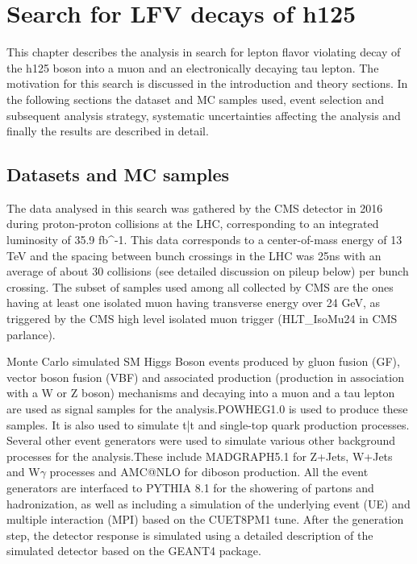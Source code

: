 
%
%

\chapter{Search for LFV decays of h125}
\label{chap:analysis_smhiggs}
This chapter describes the analysis in search for lepton flavor violating decay of the h125 boson into a muon and an electronically decaying tau lepton. The motivation for this search is discussed in the introduction and theory sections. In the following sections the dataset and MC samples used, event selection and subsequent analysis strategy, systematic uncertainties affecting the analysis and finally the results are described in detail.

\section{Datasets and MC samples}

The data analysed in this search was gathered by the CMS detector in 2016 during proton-proton collisions at the LHC, corresponding to an integrated luminosity of 35.9 fb^{-1}. This data corresponds to a center-of-mass energy of 13 TeV and the spacing between bunch crossings in the LHC was 25ns with an average of about 30 collisions (see detailed discussion on pileup below) per bunch crossing. The subset of samples used among all collected by CMS are the ones having at least one isolated muon having transverse energy over 24 GeV, as triggered by the CMS high level isolated muon trigger (HLT_IsoMu24 in CMS parlance).

Monte Carlo simulated SM Higgs Boson events produced by  gluon fusion (GF), vector boson fusion (VBF) and associated production (production in association with a W or Z boson) mechanisms and decaying into a muon and a tau lepton are used as signal samples for the analysis.POWHEG1.0 is used to produce these samples. It is also used to simulate t\bar{t} and single-top quark production processes. Several other event generators were used to simulate various other background processes for the analysis.These include MADGRAPH5.1 for Z+Jets, W+Jets and W$\gamma$ processes and AMC@NLO for diboson production. All the event generators are interfaced to PYTHIA 8.1 for the showering of partons and hadronization, as well as including a simulation of the underlying event (UE) and multiple interaction (MPI) based on the CUET8PM1 tune. After the generation step, the detector response is simulated using a detailed description of the simulated detector based on the GEANT4 package.












%
% 
% 
